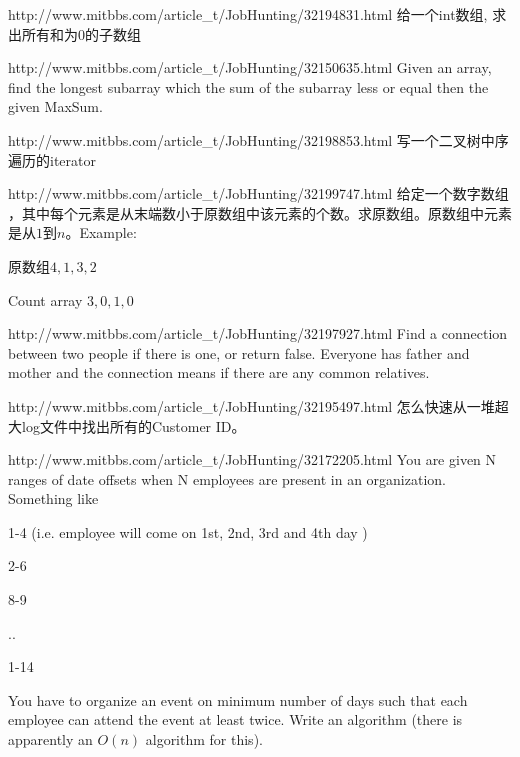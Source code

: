 \documentclass[a4paper]{article}
\begin{document}
\begin{CJK}{UTF8}{gbsn}
\begin{enumerate}
\begin{Q}{http://www.mitbbs.com/article_t/JobHunting/32194831.html}
给一个int数组, 求出所有和为0的子数组
\end{Q}

\begin{Q}{http://www.mitbbs.com/article_t/JobHunting/32150635.html}
Given an array, find the longest subarray which the sum of the subarray less or equal then the given MaxSum.
\end{Q}

\begin{Q}{http://www.mitbbs.com/article_t/JobHunting/32198853.html}
写一个二叉树中序遍历的iterator
\end{Q}

\begin{Q}{http://www.mitbbs.com/article_t/JobHunting/32199747.html}
给定一个数字数组 ，其中每个元素是从末端数小于原数组中该元素的个数。求原数组。原数组中元素是从$1$到$n$。Example:

原数组$4,1, 3, 2$

Count array  $3, 0, 1, 0$
\end{Q}

\begin{Q}[Google]{http://www.mitbbs.com/article_t/JobHunting/32197927.html}
Find a connection between two people if there is one, or return false. Everyone has father and mother and the connection means if there are any common relatives.
\end{Q}

\begin{Q}[Amazon]{http://www.mitbbs.com/article_t/JobHunting/32195497.html}
怎么快速从一堆超大log文件中找出所有的Customer ID。
\end{Q}

\begin{Q}[Facebook]{http://www.mitbbs.com/article_t/JobHunting/32172205.html}
You are given N ranges of date offsets when N employees are present in an organization. Something like

1-4 (i.e. employee will come on 1st, 2nd, 3rd and 4th day )

2-6

8-9

..

1-14

You have to organize an event on minimum number of days such that each employee can attend the event at least twice. Write an algorithm (there is apparently an $O(n)$ algorithm for this).
\end{Q}


\end{enumerate}
\end{CJK}
\end{document}
